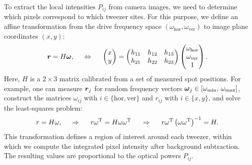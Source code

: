 
To extract the local intensities $P_{ij}$ from camera images, we need to determine which pixels correspond to which tweezer sites. For this purpose, we define an affine transformation from the drive frequency space $(\omega_{\mathrm{hor}}, \omega_{\mathrm{ver}})$ to image plane coordinates $(x, y)$:
\begin{equation*}
    \boldsymbol{r} = H \boldsymbol{\omega},
    \hspace{5 mm} \Leftrightarrow \hspace{5 mm} 
    \begin{pmatrix}
        x \\ y
    \end{pmatrix} = \begin{pmatrix}
        h_{11} & h_{12} & h_{13} \\
        h_{21} & h_{22} & h_{23}
    \end{pmatrix} 
    \begin{pmatrix}
        \omega_{\textnormal{hor}} \\
        \omega_{\textnormal{ver}} \\
        1
    \end{pmatrix}.
\end{equation*}
Here, $H$ is a $2 \times 3$ matrix calibrated from a set of measured spot positions. For example, one can measure $\boldsymbol{r}_j$ for random frequency vectors $\boldsymbol{\omega}_j \in [\omega_{\mathrm{min}},\, \omega_{\mathrm{max}}]$, construct the matrices $\omega_{ij}$ with $i \in \{\mathrm{hor}, \mathrm{ver}\}$ and $r_{ij}$ with $i \in \{x, y\}$, and solve the least-squares problem:
\begin{equation}
    r = H \omega,
    \hspace{0.5cm} \Rightarrow \hspace{0.5cm}
    r \omega^\mathrm{T} = H \omega \omega^\mathrm{T}
    \hspace{0.5cm} \Rightarrow \hspace{0.5cm}
    r \omega^\mathrm{T} \left(\omega \omega^\mathrm{T}\right)^{-1} = H.
    \label{eq:linreg-freq2pos}
\end{equation}
This transformation defines a region of interest around each tweezer, within which we compute the integrated pixel intensity after background subtraction. The resulting values are proportional to the optical powers $P_{ij}$.


